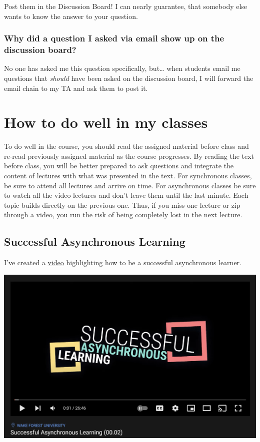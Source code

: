 Post them in the Discussion Board! I can nearly guarantee, that somebody else wants to know the answer to your question.

\hypertarget{why-did-a-question-i-asked-via-email-show-up-on-the-discussion-board}{%
\subsection{Why did a question I asked via email show up on the discussion board?}\label{why-did-a-question-i-asked-via-email-show-up-on-the-discussion-board}}

No one has asked me this question specifically, but\ldots{} when students email me questions that \emph{should} have been asked on the discussion board, I will forward the email chain to my TA and ask them to post it.

\hypertarget{how-to-do-well-in-my-classes}{%
\chapter{How to do well in my classes}\label{how-to-do-well-in-my-classes}}

To do well in the course, you should read the assigned material before class and re-read previously assigned material as the course progresses.
By reading the text before class, you will be better prepared to ask questions and integrate the content of lectures with what was presented in the text.
For synchronous classes, be sure to attend all lectures and arrive on time.
For asynchronous classes be sure to watch all the video lectures and don't leave them until the last minute. Each topic builds directly on the previous one.
Thus, if you miss one lecture or zip through a video, you run the risk of being completely lost in the next lecture.

\hypertarget{successful-asynchronous-learning}{%
\section{Successful Asynchronous Learning}\label{successful-asynchronous-learning}}

I've created a \href{https://youtu.be/dc3D2tbl8G0}{video} highlighting how to be a successful asynchronous learner.

\includegraphics[width=30.76in]{img/learngood}

